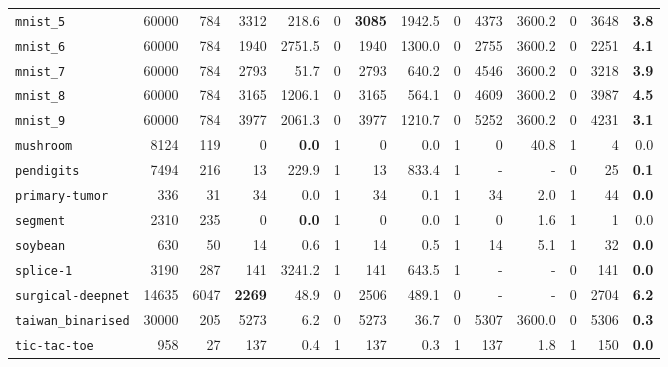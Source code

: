 \begin{tabular}{lccrrrrrrrrrrr}
\texttt{mnist\_5} & \multicolumn{1}{r}{60000} & \multicolumn{1}{r}{784}  & 3312 & 218.6 & 0 & \textbf{3085} & 1942.5 & 0 & 4373 & 3600.2 & 0 & 3648 & \textbf{3.8}\\
\texttt{mnist\_6} & \multicolumn{1}{r}{60000} & \multicolumn{1}{r}{784}  & 1940 & 2751.5 & 0 & 1940 & 1300.0 & 0 & 2755 & 3600.2 & 0 & 2251 & \textbf{4.1}\\
\texttt{mnist\_7} & \multicolumn{1}{r}{60000} & \multicolumn{1}{r}{784}  & 2793 & 51.7 & 0 & 2793 & 640.2 & 0 & 4546 & 3600.2 & 0 & 3218 & \textbf{3.9}\\
\texttt{mnist\_8} & \multicolumn{1}{r}{60000} & \multicolumn{1}{r}{784}  & 3165 & 1206.1 & 0 & 3165 & 564.1 & 0 & 4609 & 3600.2 & 0 & 3987 & \textbf{4.5}\\
\texttt{mnist\_9} & \multicolumn{1}{r}{60000} & \multicolumn{1}{r}{784}  & 3977 & 2061.3 & 0 & 3977 & 1210.7 & 0 & 5252 & 3600.2 & 0 & 4231 & \textbf{3.1}\\
\texttt{mushroom} & \multicolumn{1}{r}{8124} & \multicolumn{1}{r}{119}  & 0 & \textbf{0.0} & 1 & 0 & 0.0 & 1 & 0 & 40.8 & 1 & 4 & 0.0\\
\texttt{pendigits} & \multicolumn{1}{r}{7494} & \multicolumn{1}{r}{216}  & 13 & 229.9 & 1 & 13 & 833.4 & 1 & - & - & 0 & 25 & \textbf{0.1}\\
\texttt{primary-tumor} & \multicolumn{1}{r}{336} & \multicolumn{1}{r}{31}  & 34 & 0.0 & 1 & 34 & 0.1 & 1 & 34 & 2.0 & 1 & 44 & \textbf{0.0}\\
\texttt{segment} & \multicolumn{1}{r}{2310} & \multicolumn{1}{r}{235}  & 0 & \textbf{0.0} & 1 & 0 & 0.0 & 1 & 0 & 1.6 & 1 & 1 & 0.0\\
\texttt{soybean} & \multicolumn{1}{r}{630} & \multicolumn{1}{r}{50}  & 14 & 0.6 & 1 & 14 & 0.5 & 1 & 14 & 5.1 & 1 & 32 & \textbf{0.0}\\
\texttt{splice-1} & \multicolumn{1}{r}{3190} & \multicolumn{1}{r}{287}  & 141 & 3241.2 & 1 & 141 & 643.5 & 1 & - & - & 0 & 141 & \textbf{0.0}\\
\texttt{surgical-deepnet} & \multicolumn{1}{r}{14635} & \multicolumn{1}{r}{6047}  & \textbf{2269} & 48.9 & 0 & 2506 & 489.1 & 0 & - & - & 0 & 2704 & \textbf{6.2}\\
\texttt{taiwan\_binarised} & \multicolumn{1}{r}{30000} & \multicolumn{1}{r}{205}  & 5273 & 6.2 & 0 & 5273 & 36.7 & 0 & 5307 & 3600.0 & 0 & 5306 & \textbf{0.3}\\
\texttt{tic-tac-toe} & \multicolumn{1}{r}{958} & \multicolumn{1}{r}{27}  & 137 & 0.4 & 1 & 137 & 0.3 & 1 & 137 & 1.8 & 1 & 150 & \textbf{0.0}\\

\end{tabular}
